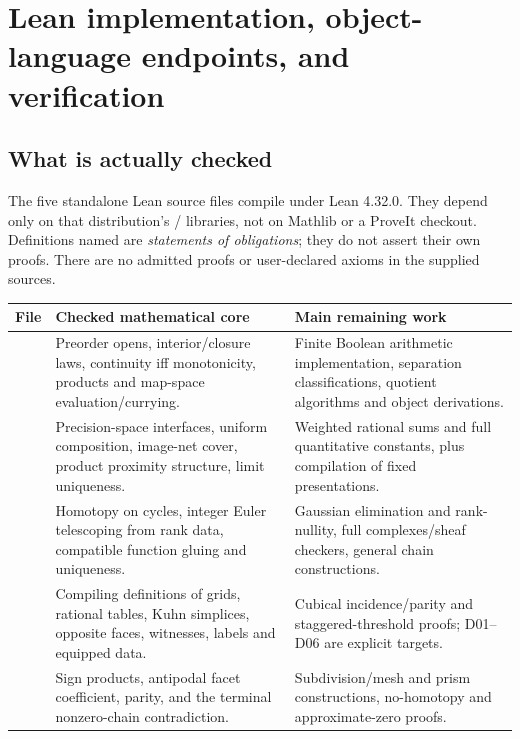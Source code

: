 \section{Lean implementation, object-language endpoints, and verification}
\label{sec:formalization}

\subsection{What is actually checked}

The five standalone Lean source files compile under Lean 4.32.0. They depend only on that distribution's / libraries, not on Mathlib or a ProveIt checkout. Definitions named  are \emph{statements of obligations}; they do not assert their own proofs. There are no admitted proofs or user-declared axioms in the supplied sources.

\begin{longtable}{P{.31\textwidth}P{.32\textwidth}P{.28\textwidth}}
\toprule
File & Checked mathematical core & Main remaining work\\
\midrule
\endhead
{} &
Preorder opens, interior/closure laws, continuity iff monotonicity, products and map-space evaluation/currying. &
Finite Boolean arithmetic implementation, separation classifications, quotient algorithms and object derivations.\\
 &
Precision-space interfaces, uniform composition, image-net cover, product proximity structure, limit uniqueness. &
Weighted rational sums and full quantitative constants, plus compilation of fixed presentations.\\
 &
Homotopy on cycles, integer Euler telescoping from rank data, compatible function gluing and uniqueness. &
Gaussian elimination and rank-nullity, full complexes/sheaf checkers, general chain constructions.\\
 &
Compiling definitions of grids, rational tables, Kuhn simplices, opposite faces, witnesses, labels and equipped data. &
Cubical incidence/parity and staggered-threshold proofs; D01--D06 are explicit targets.\\
 &
Sign products, antipodal facet coefficient, parity, and the terminal nonzero-chain contradiction. &
Subdivision/mesh and prism constructions, no-homotopy and approximate-zero proofs.\\
\bottomrule
\end{longtable}

